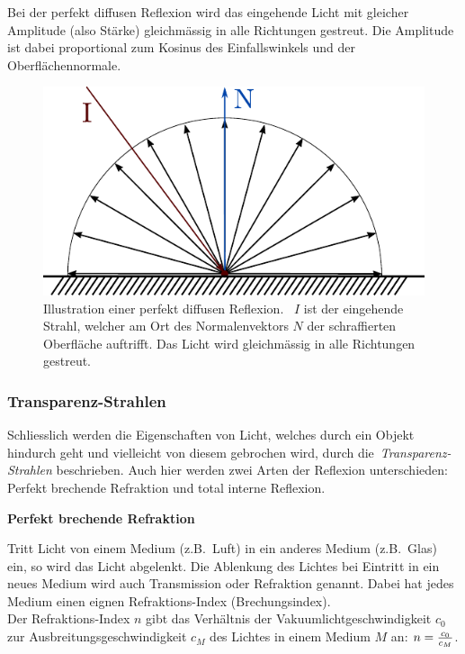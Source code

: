 Bei der perfekt diffusen Reflexion wird das eingehende Licht mit
gleicher Amplitude (also Stärke) gleichmässig in alle Richtungen
gestreut. Die Amplitude ist dabei proportional zum Kosinus des
Einfallswinkels und der Oberflächennormale.

\begin{figure}[H]\label{fig:ray_tracing_diffuse_reflection}
    \centering
    \includegraphics{img/perfect_diffuse_reflection.pdf}
    \caption{Illustration einer perfekt diffusen
        Reflexion.~\protect\footnotemark{}
        $I$ ist der eingehende Strahl, welcher am Ort des
        Normalenvektors $N$ der schraffierten Oberfläche auftrifft. Das
        Licht wird gleichmässig in alle Richtungen gestreut.}
\end{figure}

\subsubsection{Transparenz-Strahlen}
\label{ssubsec:ray_tracing:transparency_rays}

Schliesslich werden die Eigenschaften von Licht, welches durch ein
Objekt hindurch geht und vielleicht von diesem gebrochen wird, durch
die~\textit{Transparenz-Strahlen} beschrieben. Auch hier werden zwei
Arten der Reflexion unterschieden: Perfekt brechende Refraktion und
total interne Reflexion.

\textbf{Perfekt brechende Refraktion}

Tritt Licht von einem Medium (z.B.~Luft) in ein anderes Medium (z.B.\
Glas) ein, so wird das Licht abgelenkt. Die Ablenkung des Lichtes bei
Eintritt in ein neues Medium wird auch Transmission oder Refraktion
genannt. Dabei hat jedes Medium einen eignen Refraktions-Index
(Brechungsindex).\\
Der Refraktions-Index $n$ gibt das Verhältnis der
Vakuumlichtgeschwindigkeit $c_{0}$ zur Ausbreitungsgeschwindigkeit
$c_{M}$ des Lichtes in einem Medium $M$ an: $n = {c_{0} \over c_{M}}$.

